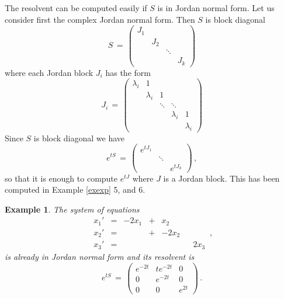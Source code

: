 \documentclass[12pt]{report}
\newtheorem{example}[theorem]{Example}
\begin{document}
The resolvent can be computed easily if $S$ is in Jordan normal form.
Let us consider first the complex Jordan normal form.  Then $S$ is
block diagonal
\begin{equation}\label{jnf}
S \,=\, \left( \begin{array}{cccc} 
J_1 &        &      &    \\ 
        &J_2 &      &     \\
        &       &\ddots&     \\
        &       &        & J_k  
\end{array}
\right)         
\end{equation} 
where each Jordan block $J_i$ has the form
\begin{equation}\label{lamj}
J_i \,=\, \left( \begin{array}{ccccc} 
\lambda_i &  1       &         &          &           \\ 
          &\lambda_i &     1   &          &        \\
          &          &  \ddots & \ddots  &         \\
          &          &         &\lambda_i & 1       \\
          &          &         &          & \lambda_i      
\end{array}
\right)       
\end{equation}
Since $S$ is block diagonal we have
\begin{equation}
e^{tS} \,=\, \left( \begin{array}{ccc} 
e^{tJ_1} &        &         \\ 
        &\ddots &           \\
        &       & e^{tJ_k}         
\end{array} \right) \,,
\end{equation}
so that it is enough to compute $e^{tJ}$ where $J$ is a Jordan block. This has been
computed in Example \ref{exexp} 5, and 6.  


\begin{example}{\rm 
The system of equations
\begin{equation}
\begin{array}{ccccccc}
 x_1'   & =& -2 x_1 & + &    x_2 &   &        \\
 x_2'   & =&             & + &   -2 x_2 &   &      \\
 x_3'   & =&             &    &            &    & 2 x_3  
\end{array} \,,
\end{equation}
is already in Jordan normal form and its resolvent is 
\begin{equation}
e^{tS} \,=\,\left( \begin{array}{ccc}
  e^{-2t} &   t e^{-2t} &   0      \\
         0    &    e^{-2t} &     0   \\
        0     &      0          &  e^{2t}  
\end{array} \right) \,.
\end{equation}

}
\end{example}
\end{document}
